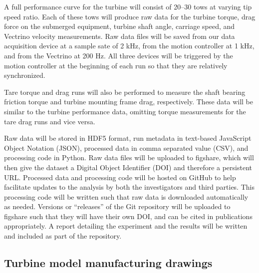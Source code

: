 \documentclass[14pt,letterpaper]{scrreprt}
\begin{document}
A full performance curve for the turbine will consist of 20--30 tows at varying
tip speed ratio. Each of these tows will produce raw data for the turbine
torque, drag force on the submerged equipment, turbine shaft angle, carriage
speed, and Vectrino velocity measurements. Raw data files will be saved from our
data acquisition device at a sample sate of 2 kHz, from the motion controller at
1 kHz, and from the Vectrino at 200 Hz. All three devices will be triggered by
the motion controller at the beginning of each run so that they are relatively
synchronized.

Tare torque and drag runs will also be performed to measure the shaft bearing
friction torque and turbine mounting frame drag, respectively. These data will
be similar to the turbine performance data, omitting torque measurements for the
tare drag runs and vice versa.

Raw data will be stored in HDF5 format, run metadata in text-based JavaScript
Object Notation (JSON), processed data in comma separated value (CSV), and
processing code in Python. Raw data files will be uploaded to figshare, which
will then give the dataset a Digital Object Identifier (DOI) and therefore a
persistent URL. Processed data and processing code will be hosted on GitHub to
help facilitate updates to the analysis by both the investigators and third
parties. This processing code will be written such that raw data is downloaded
automatically as needed. Versions  or ``releases'' of the Git repository will be
uploaded to figshare such that they will have their own DOI, and can be cited in
publications appropriately. A report detailing the experiment and the results
will be written and included as part of the repository.

\renewcommand{\bibname}{References}



\begin{appendices}

\chapter{Turbine model manufacturing drawings}

\label{app-turbine_dwgs}












\end{appendices}
\end{document}
